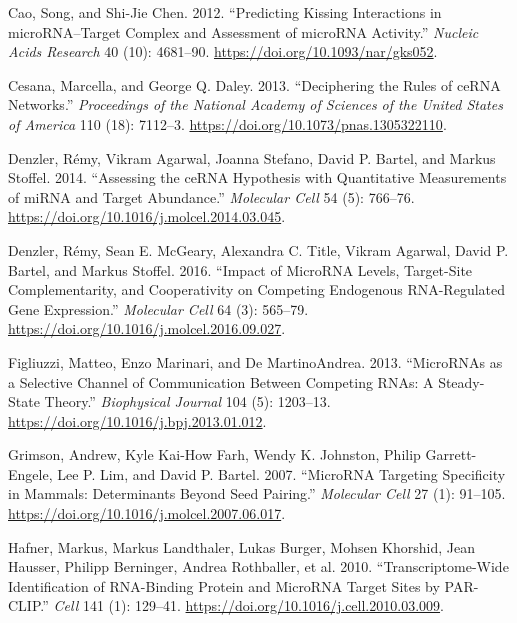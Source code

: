 \documentclass[]{article}
\begin{document}
\leavevmode\hypertarget{ref-cao_predicting_2012}{}%
Cao, Song, and Shi-Jie Chen. 2012. ``Predicting Kissing Interactions in
microRNA--Target Complex and Assessment of microRNA Activity.''
\emph{Nucleic Acids Research} 40 (10): 4681--90.
\url{https://doi.org/10.1093/nar/gks052}.

\leavevmode\hypertarget{ref-cesana_deciphering_2013}{}%
Cesana, Marcella, and George Q. Daley. 2013. ``Deciphering the Rules of
ceRNA Networks.'' \emph{Proceedings of the National Academy of Sciences
of the United States of America} 110 (18): 7112--3.
\url{https://doi.org/10.1073/pnas.1305322110}.

\leavevmode\hypertarget{ref-denzler_assessing_2014}{}%
Denzler, Rémy, Vikram Agarwal, Joanna Stefano, David P. Bartel, and
Markus Stoffel. 2014. ``Assessing the ceRNA Hypothesis with Quantitative
Measurements of miRNA and Target Abundance.'' \emph{Molecular Cell} 54
(5): 766--76. \url{https://doi.org/10.1016/j.molcel.2014.03.045}.

\leavevmode\hypertarget{ref-denzler_impact_2016}{}%
Denzler, Rémy, Sean E. McGeary, Alexandra C. Title, Vikram Agarwal,
David P. Bartel, and Markus Stoffel. 2016. ``Impact of MicroRNA Levels,
Target-Site Complementarity, and Cooperativity on Competing Endogenous
RNA-Regulated Gene Expression.'' \emph{Molecular Cell} 64 (3): 565--79.
\url{https://doi.org/10.1016/j.molcel.2016.09.027}.

\leavevmode\hypertarget{ref-figliuzzi_micrornas_2013}{}%
Figliuzzi, Matteo, Enzo Marinari, and De MartinoAndrea. 2013.
``MicroRNAs as a Selective Channel of Communication Between Competing
RNAs: A Steady-State Theory.'' \emph{Biophysical Journal} 104 (5):
1203--13. \url{https://doi.org/10.1016/j.bpj.2013.01.012}.

\leavevmode\hypertarget{ref-grimson_microrna_2007}{}%
Grimson, Andrew, Kyle Kai-How Farh, Wendy K. Johnston, Philip
Garrett-Engele, Lee P. Lim, and David P. Bartel. 2007. ``MicroRNA
Targeting Specificity in Mammals: Determinants Beyond Seed Pairing.''
\emph{Molecular Cell} 27 (1): 91--105.
\url{https://doi.org/10.1016/j.molcel.2007.06.017}.

\leavevmode\hypertarget{ref-hafner_transcriptome-wide_2010}{}%
Hafner, Markus, Markus Landthaler, Lukas Burger, Mohsen Khorshid, Jean
Hausser, Philipp Berninger, Andrea Rothballer, et al. 2010.
``Transcriptome-Wide Identification of RNA-Binding Protein and MicroRNA
Target Sites by PAR-CLIP.'' \emph{Cell} 141 (1): 129--41.
\url{https://doi.org/10.1016/j.cell.2010.03.009}.
\end{document}
